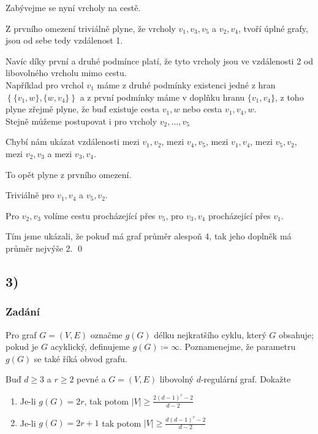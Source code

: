 \documentclass[../main.tex]{subfiles}
\begin{document}
Zabývejme se nyní vrcholy na cestě.

Z prvního omezení triviálně plyne, že vrcholy $v_1, v_3, v_5$  a $v_2, v_4$,
tvoří úplné grafy, jsou od sebe tedy vzdálenost 1. 

Navíc díky první a druhé podmínce platí, že tyto
vrcholy jsou ve vzdálenosti 2 od libovolného vrcholu mimo cestu.\\
Například pro vrchol $v_1$ máme z druhé podmínky existenci jedné z 
hran $\left\{\{v_1, w\}, \{w, v_4\}\right\}$ a z první podmínky máme v doplňku hranu $\{v_1,v_4\}$, 
z toho plyne zřejmě plyne, že buď existuje cesta $v_1, w$ nebo cesta $v_1, v_4, w$.\\
Stejně můžeme postupovat i pro vrcholy $v_2, ... , v_5$


Chybí nám ukázat vzdálenosti mezi $v_1,v_2$, mezi $v_4,v_5$, mezi $v_1, v_4$, mezi $v_5, v_2$, mezi $v_2, v_3$ a mezi $v_3, v_4$.

To opět plyne z prvního omezení.

Triviálně pro $v_1, v_4$ a $v_5, v_2$.

Pro $v_2, v_3$ volíme cestu procházející přes $v_5$, pro $v_3, v_4$ procházející přes $v_1$.

Tím jsme ukázali, že pokuď má graf průměr alespoň 4, tak jeho doplněk má průměr nejvýše 2.
\qed




\subsection{3)}
\subsubsection*{Zadání}
Pro graf $G=(V,E)$ označme $g(G)$ délku nejkratšího cyklu, který $G$ obsahuje; pokud je $G$ acyklický, definujeme $g(G)\coloneq \infty$.
Poznamenejme, že parametru $g(G)$ se také říká obvod grafu.

Buď $d\geq 3$ a $r\geq 2$ pevné a $G=(V,E)$ libovolný $d$-regulární graf. Dokažte
\begin{enumerate}
    \item Je-li $g(G)=2r$, tak  potom $|V| \geq \frac{2(d-1)^r -2}{d-2}$
    \item Je-li $g(G) = 2r + 1$ tak potom $|V|\geq \frac{d(d-1)^r -2}{d-2}$
\end{enumerate}
\end{document}
